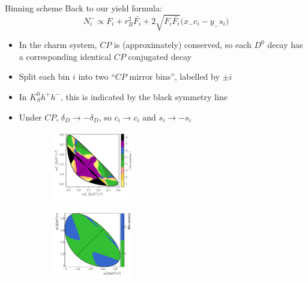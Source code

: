 \documentclass{beamer}
\begin{document}
\begin{frame}{Binning scheme}
  \vspace{0.0cm}
  {\large Back to our yield formula:}
  \begin{equation*}
    N_i^-\propto F_i + r_B^2\bar{F_i} + 2\sqrt{F_i\bar{F_i}}\big(x_-c_i - y_-s_i\big)
  \end{equation*}
  \vspace{-0.3cm}
  \begin{itemize}
    \setlength\itemsep{0.5em}
    \item{In the charm system, $C\!P$ is (approximately) conserved, so each $D^0$ decay has a corresponding identical $C\!P$ conjugated decay}
    \item{Split each bin $i$ into two ``$C\!P$ mirror bins'', labelled by $\pm i$}
    \item{In $K_S^0h^+h^-$, this is indicated by the black symmetry line}
    \item{Under $C\!P$, $\delta_D\to-\delta_D$, so $c_i\to c_i$ and $s_i\to -s_i$}
  \end{itemize}
  \begin{figure}
    \centering
    \begin{subfigure}{0.45\textwidth}
      \centering
      \includegraphics[height = 3cm]{Plots/KsPiPi_optimal.png}
    \end{subfigure}%
    \begin{subfigure}{0.45\textwidth}
      \centering
      \includegraphics[height = 3cm]{Plots/KsKK_binning.png}
    \end{subfigure}
  \end{figure}
\end{frame}
\end{document}
